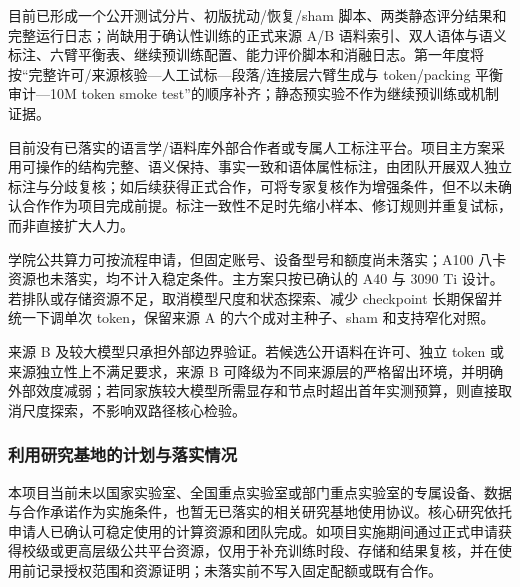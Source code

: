 目前已形成一个公开测试分片、初版扰动/恢复/sham 脚本、两类静态评分结果和完整运行日志；尚缺用于确认性训练的正式来源 A/B 语料索引、双人语体与语义标注、六臂平衡表、继续预训练配置、能力评价脚本和消融日志。第一年度将按“完整许可/来源核验—人工试标—段落/连接层六臂生成与 token/packing 平衡审计—10M token smoke test”的顺序补齐；静态预实验不作为继续预训练或机制证据。

目前没有已落实的语言学/语料库外部合作者或专属人工标注平台。项目主方案采用可操作的结构完整、语义保持、事实一致和语体属性标注，由团队开展双人独立标注与分歧复核；如后续获得正式合作，可将专家复核作为增强条件，但不以未确认合作作为项目完成前提。标注一致性不足时先缩小样本、修订规则并重复试标，而非直接扩大人力。

学院公共算力可按流程申请，但固定账号、设备型号和额度尚未落实；A100 八卡资源也未落实，均不计入稳定条件。主方案只按已确认的 A40 与 3090 Ti 设计。若排队或存储资源不足，取消模型尺度和状态探索、减少 checkpoint 长期保留并统一下调单次 token，保留来源 A 的六个成对主种子、sham 和支持窄化对照。

来源 B 及较大模型只承担外部边界验证。若候选公开语料在许可、独立 token 或来源独立性上不满足要求，来源 B 可降级为不同来源层的严格留出环境，并明确外部效度减弱；若同家族较大模型所需显存和节点时超出首年实测预算，则直接取消尺度探索，不影响双路径核心检验。

\subsubsection{利用研究基地的计划与落实情况}

本项目当前未以国家实验室、全国重点实验室或部门重点实验室的专属设备、数据与合作承诺作为实施条件，也暂无已落实的相关研究基地使用协议。核心研究依托申请人已确认可稳定使用的计算资源和团队完成。如项目实施期间通过正式申请获得校级或更高层级公共平台资源，仅用于补充训练时段、存储和结果复核，并在使用前记录授权范围和资源证明；未落实前不写入固定配额或既有合作。
